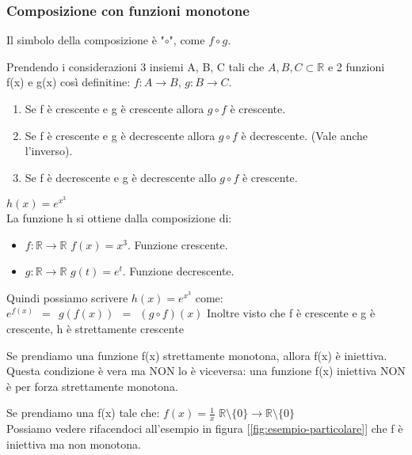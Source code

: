 \subsubsection{Composizione con funzioni monotone}
\begin{note}
     Il simbolo della composizione è "$\circ$", come $f \circ g$.
\end{note}
Prendendo i considerazioni 3 insiemi A, B, C tali che $A, B, C \subset \mathbb{R}$ e 2 funzioni f(x) e g(x) così definitine: \hspace{.2cm} $f: A \longrightarrow B$, $g: B \longrightarrow C $.
\begin{enumerate}
    \item Se f è crescente e g è crescente allora $g \circ f$ è crescente.
    \item Se f è crescente e g è decrescente allora $g \circ f$ è decrescente. (Vale anche l'inverso).
    \item Se f è decrescente e g è decrescente allo $g \circ f$ è crescente. 
\end{enumerate}
\begin{example}
    $h(x) = e^{x^3}$\\
    La funzione h si ottiene dalla composizione di:
    \begin{itemize}
        \item $f: \mathbb{R} \longrightarrow \mathbb{R}$ \hspace{.3cm} $f(x) = x^3$. Funzione crescente.
        \item $g: \mathbb{R} \longrightarrow \mathbb{R}$ \hspace{.3cm} $g(t) = e^t$. Funzione decrescente.
    \end{itemize}
    Quindi possiamo scrivere $h(x) = e^{x^3}$ come: \hspace{.3cm} $e^{f(x)} \: \: = \: \: g(f(x)) \: \: = \: \: (g \circ f)(x)$
    Inoltre visto che f è crescente e g è crescente, h è strettamente crescente 
\end{example}
\begin{observation}
    Se prendiamo una funzione f(x) strettamente monotona, allora f(x) è iniettiva. Questa condizione è vera ma NON lo è viceversa: una funzione f(x) iniettiva NON è per forza strettamente monotona. 
\end{observation}
\begin{example}
    Se prendiamo una f(x) tale che: \hspace{.3cm} $f(x) = \frac{1}{x}$ \hspace{.3cm} $\mathbb{R} \setminus \{0\} \longrightarrow \mathbb{R} \setminus \{0\}$
    \\Possiamo vedere rifacendoci all'esempio in figura [\ref{fig:esempio-particolare}] che f è iniettiva ma non monotona.
\end{example}

